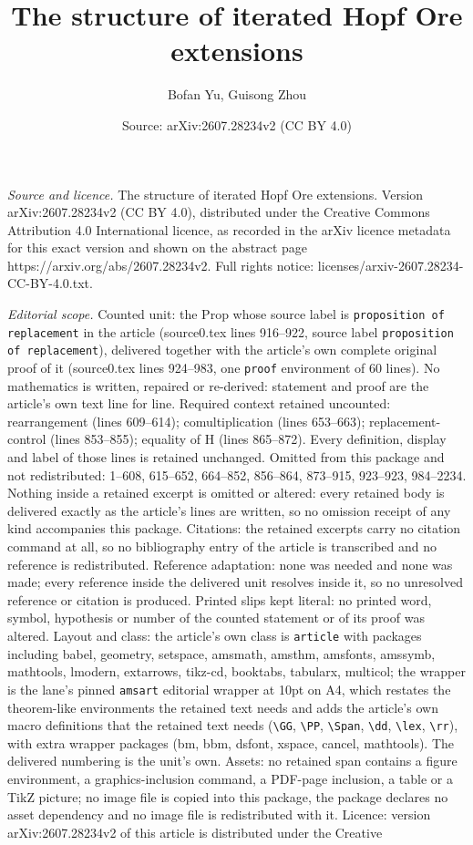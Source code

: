 \documentclass[10pt,a4paper]{amsart}
\title[The structure of iterated Hopf Ore extensions]{The structure of iterated Hopf Ore extensions}
\author{Bofan Yu, Guisong Zhou}
\date{Source: arXiv:2607.28234v2 (CC BY 4.0)}
\begin{document}
\maketitle

\noindent\emph{Source and licence.} The structure of iterated Hopf Ore extensions. Version arXiv:2607.28234v2 (CC BY 4.0), distributed under the Creative Commons Attribution 4.0 International licence, as recorded in the arXiv licence metadata for this exact version and shown on the abstract page https://arxiv.org/abs/2607.28234v2. Full rights notice: licenses/arxiv-2607.28234-CC-BY-4.0.txt.\par\smallskip

\noindent\textit{Editorial scope.} Counted unit: the Prop whose source label is \texttt{proposition of replacement} in the article (source0.tex lines 916--922, source label \texttt{proposition of replacement}), delivered together with the article's own complete original proof of it (source0.tex lines 924--983, one \texttt{proof} environment of 60 lines). No mathematics is written, repaired or re-derived: statement and proof are the article's own text line for line. Required context retained uncounted: rearrangement (lines 609--614); comultiplication (lines 653--663); replacement-control (lines 853--855); equality of H (lines 865--872). Every definition, display and label of those lines is retained unchanged. Omitted from this package and not redistributed: 1--608, 615--652, 664--852, 856--864, 873--915, 923--923, 984--2234. Nothing inside a retained excerpt is omitted or altered: every retained body is delivered exactly as the article's lines are written, so no omission receipt of any kind accompanies this package. Citations: the retained excerpts carry no citation command at all, so no bibliography entry of the article is transcribed and no reference is redistributed. Reference adaptation: none was needed and none was made; every reference inside the delivered unit resolves inside it, so no unresolved reference or citation is produced. Printed slips kept literal: no printed word, symbol, hypothesis or number of the counted statement or of its proof was altered. Layout and class: the article's own class is \texttt{article} with packages including babel, geometry, setspace, amsmath, amsthm, amsfonts, amssymb, mathtools, lmodern, extarrows, tikz-cd, booktabs, tabularx, multicol; the wrapper is the lane's pinned \texttt{amsart} editorial wrapper at 10pt on A4, which restates the theorem-like environments the retained text needs and adds the article's own macro definitions that the retained text needs (\texttt{\textbackslash GG}, \texttt{\textbackslash PP}, \texttt{\textbackslash Span}, \texttt{\textbackslash dd}, \texttt{\textbackslash lex}, \texttt{\textbackslash rr}), with extra wrapper packages (bm, bbm, dsfont, xspace, cancel, mathtools). The delivered numbering is the unit's own. Assets: no retained span contains a figure environment, a graphics-inclusion command, a PDF-page inclusion, a table or a TikZ picture; no image file is copied into this package, the package declares no asset dependency and no image file is redistributed with it. Licence: version arXiv:2607.28234v2 of this article is distributed under the Creative 
\end{document}
